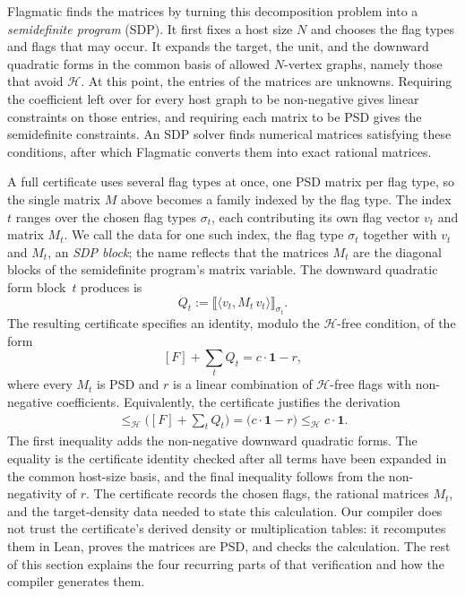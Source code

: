 \documentclass{article}
\begin{document}
Flagmatic finds the matrices by turning this decomposition problem into a
\emph{semidefinite program} (SDP).  It first fixes a host size $N$ and chooses
the flag types and flags that may occur.  It expands the target, the unit, and
the downward quadratic forms in the common basis of allowed $N$-vertex graphs,
namely those that avoid $\mathcal H$.  At this point, the entries of the matrices
are unknowns.  Requiring the coefficient left over for every host graph to be
non-negative gives linear constraints on those entries, and requiring each
matrix to be PSD gives the semidefinite constraints.  An SDP solver finds
numerical matrices satisfying these conditions, after which Flagmatic converts
them into exact rational matrices.

A full certificate uses several flag types at once, one PSD matrix per flag
type, so the single matrix $M$ above becomes a family indexed by the flag type.
The index $t$ ranges over the chosen flag types $\sigma_t$, each contributing
its own flag vector $v_t$ and matrix $M_t$.  We call the data for one such
index, the flag type $\sigma_t$ together with $v_t$ and $M_t$, an \emph{SDP block};
the name reflects that the matrices $M_t$ are the diagonal blocks of the
semidefinite program's matrix variable.  The downward quadratic form
block~$t$ produces is
\[
  Q_t := \bigl\llbracket
    \langle v_t, M_t\, v_t\rangle
  \bigr\rrbracket_{\sigma_t}.
\]
The resulting certificate specifies an identity, modulo the $\mathcal H$-free
condition, of the form
\[
  [F] + \sum_t Q_t
  =
  c\cdot\mathbf{1} - r,
\]
where every $M_t$ is PSD and $r$ is a linear combination of $\mathcal H$-free
flags with non-negative coefficients.  Equivalently,
the certificate justifies the derivation
\begin{align*}
  [F]
  \leq_{\mathcal H}
  \bigl([F]+\sum_t Q_t\bigr)
  =
  \bigl(c\cdot\mathbf{1}-r\bigr)
  \leq_{\mathcal H} c\cdot\mathbf{1}.
\end{align*}
The first inequality adds the non-negative downward quadratic forms.  The
equality is the certificate identity checked after all terms have been
expanded in the common host-size basis, and the final inequality follows from
the non-negativity of $r$.  The certificate records the chosen
flags, the rational matrices $M_t$, and the target-density data needed to state
this calculation.  Our compiler does not trust the certificate's derived
density or multiplication tables: it recomputes them in Lean, proves the
matrices are PSD, and checks the calculation.  The rest of this section explains
the four recurring parts of that verification and how the compiler generates
them.
\end{document}
